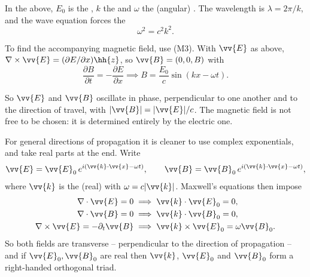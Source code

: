 \begin{definition}
	In the above, $E_0$ is the , $k$ the  and $\omega$ the (angular) . The wavelength is $\lambda = 2\pi/k$, and the wave equation forces the 
	$$
	\omega^2 = c^2 k^2.
	$$
\end{definition}

To find the accompanying magnetic field, use (M3). With $\vv{E}$ as above, $\nabla\times\vv{E} = (\partial E/\partial x)\hh{z}$, so $\vv{B} = (0,0,B)$ with
$$
\frac{\partial B}{\partial t} = -\frac{\partial E}{\partial x} \implies B = \frac{E_0}{c}\sin(kx-\omega t).
$$

\begin{center}
\end{center}

So $\vv{E}$ and $\vv{B}$ oscillate in phase, perpendicular to one another and to the direction of travel, with $|\vv{B}| = |\vv{E}|/c$. The magnetic field is not free to be chosen: it is determined entirely by the electric one.

For general directions of propagation it is cleaner to use complex exponentials, and take real parts at the end. Write
$$
\vv{E} = \vv{E}_0\, e^{i(\vv{k}\cdot\vv{x} - \omega t)}, \qquad \vv{B} = \vv{B}_0\, e^{i(\vv{k}\cdot\vv{x}-\omega t)},
$$
where $\vv{k}$ is the (real)  with $\omega = c|\vv{k}|$. Maxwell's equations then impose
\begin{align*}
	\nabla\cdot\vv{E} = 0 &\implies \vv{k}\cdot\vv{E}_0 = 0,\\
	\nabla\cdot\vv{B} = 0 &\implies \vv{k}\cdot\vv{B}_0 = 0,\\
	\nabla\times\vv{E} = -\partial_t\vv{B} &\implies \vv{k}\times\vv{E}_0 = \omega \vv{B}_0.
\end{align*}
So both fields are transverse -- perpendicular to the direction of propagation -- and if $\vv{E}_0, \vv{B}_0$ are real then $\vv{k}$, $\vv{E}_0$ and $\vv{B}_0$ form a right-handed orthogonal triad.

